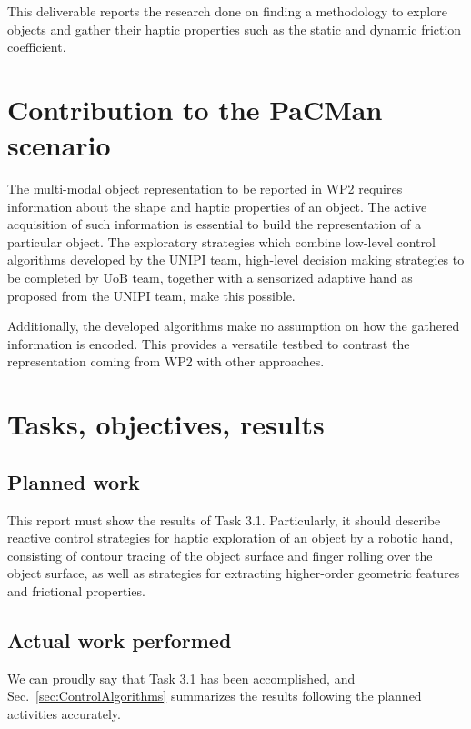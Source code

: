 \documentclass[a4paper,11pt,pdf]{pacmanreport}
\begin{document}
This deliverable reports the research done on finding a methodology to explore objects and gather their haptic properties such as the static and dynamic friction coefficient. 

\section*{Contribution to the PaCMan scenario}

The multi-modal object representation to be reported in WP2 requires information about the shape and haptic properties of an object.
The active acquisition of such information is essential to build the representation of a particular object. The exploratory strategies which combine low-level control algorithms developed by the UNIPI team, high-level decision making strategies to be completed by UoB team, together with a sensorized adaptive hand as proposed from the UNIPI team, make this possible.

Additionally, the developed algorithms make no assumption on how the gathered information is encoded. This provides a versatile testbed to contrast the representation coming from WP2 with other approaches.

\newpage

\section{Tasks, objectives, results}

\subsection{Planned work}

This report must show the results of Task 3.1. Particularly, it should describe reactive control strategies for haptic exploration of an object by a robotic hand, consisting of contour tracing of the object surface and finger rolling over the object surface, as well as strategies for extracting higher-order geometric features and frictional properties.

\subsection{Actual work performed}

We can proudly say that Task 3.1 has been accomplished, and Sec.~\ref{sec:ControlAlgorithms} summarizes the results following the planned activities accurately.
\end{document}
